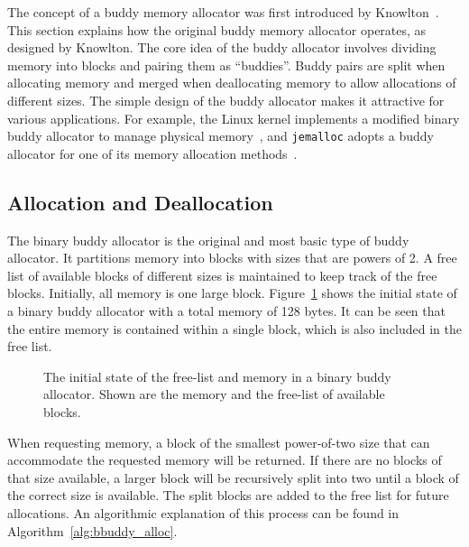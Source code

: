The concept of a buddy memory allocator was first introduced by Knowlton~\cite{buddy}. This section explains how the original buddy memory allocator operates, as designed by Knowlton. The core idea of the buddy allocator involves dividing memory into blocks and pairing them as ``buddies''. Buddy pairs are split when allocating memory and merged when deallocating memory to allow allocations of different sizes. The simple design of the buddy allocator makes it attractive for various applications. For example, the Linux kernel implements a modified binary buddy allocator to manage physical memory~\cite{linuxbuddy}, and \texttt{jemalloc} adopts a buddy allocator for one of its memory allocation methods~\cite{jemalloc}.

\subsection{Allocation and Deallocation}
The binary buddy allocator is the original and most basic type of buddy allocator. It partitions memory into blocks with sizes that are powers of 2. A free list of available blocks of different sizes is maintained to keep track of the free blocks. Initially, all memory is one large block. Figure~\ref{fig:buddystart} shows the initial state of a binary buddy allocator with a total memory of 128 bytes. It can be seen that the entire memory is contained within a single block, which is also included in the free list.

\begin{figure}[h]
    \centering
    
    \caption{The initial state of the free-list and memory in a binary buddy allocator. Shown are the memory and the free-list of available blocks.}
    \label{fig:buddystart}
\end{figure}

When requesting memory, a block of the smallest power-of-two size that can accommodate the requested memory will be returned. If there are no blocks of that size available, a larger block will be recursively split into two until a block of the correct size is available. The split blocks are added to the free list for future allocations. An algorithmic explanation of this process can be found in Algorithm~\ref{alg:bbuddy_alloc}.

